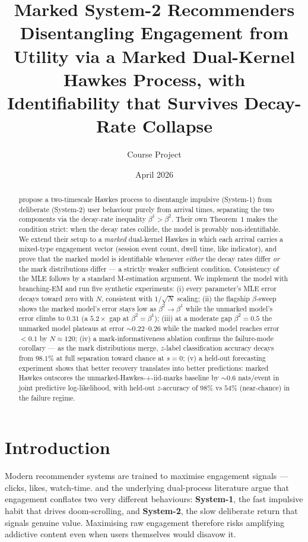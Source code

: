 \documentclass[11pt]{article}
\title{\textbf{Marked System-2 Recommenders}\\[0.4em]
\large Disentangling Engagement from Utility via a Marked Dual-Kernel Hawkes Process, with Identifiability that Survives Decay-Rate Collapse}
\author{Course Project}
\date{April 2026}
\theoremstyle{remark}
\begin{document}
\maketitle

\begin{abstract}
\citet{agarwal2024system2} propose a two-timescale Hawkes process to disentangle impulsive (System-1) from deliberate (System-2) user behaviour purely from arrival times, separating the two components via the decay-rate inequality $\beta^1 > \beta^2$. Their own Theorem~1 makes the condition strict: when the decay rates collide, the model is provably non-identifiable. We extend their setup to a \emph{marked} dual-kernel Hawkes in which each arrival carries a mixed-type engagement vector (session event count, dwell time, like indicator), and prove that the marked model is identifiable whenever \emph{either} the decay rates differ \emph{or} the mark distributions differ --- a strictly weaker sufficient condition. Consistency of the MLE follows by a standard M-estimation argument. We implement the model with branching-EM and run five synthetic experiments: (i) every parameter's MLE error decays toward zero with $N$, consistent with $1/\sqrt{N}$ scaling; (ii) the flagship $\beta$-sweep shows the marked model's error stays low as $\beta^2 \to \beta^1$ while the unmarked model's error climbs to $0.31$ (a $5.2\times$ gap at $\beta^2 = \beta^1$); (iii) at a moderate gap $\beta^2 = 0.5$ the unmarked model plateaus at error $\sim 0.22$--$0.26$ while the marked model reaches error $< 0.1$ by $N \approx 120$; (iv) a mark-informativeness ablation confirms the failure-mode corollary --- as the mark distributions merge, $z$-label classification accuracy decays from $98.1\%$ at full separation toward chance at $s=0$; (v) a held-out forecasting experiment shows that better recovery translates into better predictions: marked Hawkes outscores the unmarked-Hawkes-+-iid-marks baseline by $\sim 0.6$ nats/event in joint predictive log-likelihood, with held-out $z$-accuracy of $98\%$ vs $54\%$ (near-chance) in the failure regime.
\end{abstract}

\section{Introduction}

Modern recommender systems are trained to maximise engagement signals --- clicks, likes, watch-time. \citet{kleinberg2022challenge} and the underlying dual-process literature \citep{kahneman2011thinking} argue that engagement conflates two very different behaviours: \textbf{System-1}, the fast impulsive habit that drives doom-scrolling, and \textbf{System-2}, the slow deliberate return that signals genuine value. Maximising raw engagement therefore risks amplifying addictive content even when users themselves would disavow it.
\end{document}
